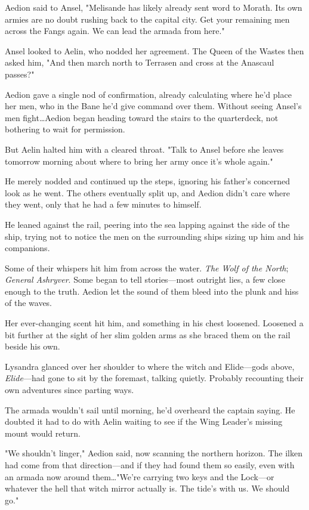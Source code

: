 Aedion said to Ansel, "Melisande has likely already sent word to Morath.
Its own armies are no doubt rushing back to the capital city.
Get your remaining men across the Fangs again.
We can lead the armada from here."

Ansel looked to Aelin, who nodded her agreement.
The Queen of the Wastes then asked him, "And then march north to Terrasen and cross at the Anascaul passes?"

Aedion gave a single nod of confirmation, already calculating where he'd place her men, who in the Bane he'd give command over them.
Without seeing Ansel's men fight\ldots Aedion began heading toward the stairs to the quarterdeck, not bothering to wait for permission.

But Aelin halted him with a cleared throat.
"Talk to Ansel before she leaves tomorrow morning about where to bring her army once it's whole again."

He merely nodded and continued up the steps, ignoring his father's concerned look as he went.
The others eventually split up, and Aedion didn't care where they went, only that he had a few minutes to himself.

He leaned against the rail, peering into the sea lapping against the side of the ship, trying not to notice the men on the surrounding ships sizing up him and his companions.

Some of their whispers hit him from across the water.
\emph{The Wolf of the North}; \emph{General Ashryver}.
Some began to tell stories---most outright lies, a few close enough to the truth.
Aedion let the sound of them bleed into the plunk and hiss of the waves.

Her ever-changing scent hit him, and something in his chest loosened.
Loosened a bit further at the sight of her slim golden arms as she braced them on the rail beside his own.

Lysandra glanced over her shoulder to where the witch and Elide---gods above, \emph{Elide}---had gone to sit by the foremast, talking quietly.
Probably recounting their own adventures since parting ways.

The armada wouldn't sail until morning, he'd overheard the captain saying.
He doubted it had to do with Aelin waiting to see if the Wing Leader's missing mount would return.

"We shouldn't linger," Aedion said, now scanning the northern horizon.
The ilken had come from that direction---and if they had found them so easily, even with an armada now around them\ldots "We're carrying two keys and the Lock---or whatever the hell that witch mirror actually is.
The tide's with us.
We should go."

